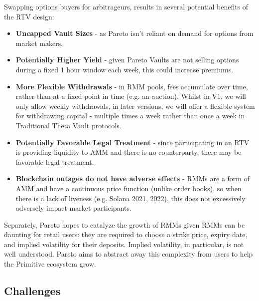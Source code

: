 \documentclass[hidelinks, 12pt]{article}
\begin{document}
Swapping options buyers for arbitrageurs, results in several potential benefits of the RTV design:
\begin{itemize}
    \item \textbf{Uncapped Vault Sizes} - as Pareto isn't reliant on demand for options from market makers.
    \item \textbf{Potentially Higher Yield} - given Pareto Vaults are not selling options during a fixed 1 hour window each week, this could increase premiums.    
    \item \textbf{More Flexible Withdrawals} - in RMM pools, fees accumulate over time, rather than at a fixed point in time (e.g. an auction). Whilst in V1, we will only allow weekly withdrawals, in later versions, we will offer a flexible system for withdrawing capital - multiple times a week rather than once a week in Traditional Theta Vault protocols.
    \item \textbf{Potentially Favorable Legal Treatment} - since participating in an RTV is providing liquidity to AMM and there is no counterparty, there may be favorable legal treatment.
    \item \textbf{Blockchain outages do not have adverse effects} - RMMs are a form of AMM and have a continuous price function (unlike order books), so when there is a lack of liveness (e.g. Solana 2021, 2022), this does not excessively adversely impact market participants.
\end{itemize}
Separately, Pareto hopes to catalyze the growth of RMMs given RMMs can be daunting for retail users: they are required to choose a strike price, expiry date, and implied volatility for their deposits. Implied volatility, in particular, is not well understood. Pareto aims to abstract away this complexity from users to help the Primitive ecosystem grow. 

\subsection{Challenges}
\label{Challenges}
\end{document}
